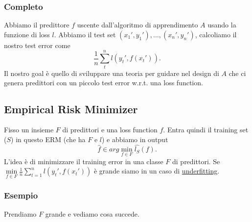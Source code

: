 \documentclass{article}
\begin{document}
\subsubsection{Completo}
Abbiamo il predittore $f$ uscente dall'algoritmo di apprendimento $A$ usando la funzione di loss $l$. Abbiamo il test set $(x_1',y_1'),\dots, (x_n',y_n')$, calcoliamo il nostro test error come
\begin{displaymath}
	\frac{1}{n} \sum\limits_t^n l(y_t', f(x_t')).
\end{displaymath}  
Il nostro goal è quello di sviluppare una teoria per guidare nel design di $A$ che ci genera predittori con un piccolo test error w.r.t. una loss function.
\subsection{Empirical Risk Minimizer}
Fisso un insieme $F$ di predittori e una loss function $f$. Entra quindi il training set ($S$) in questo ERM (che ha $F$ e $l$) e abbiamo in output
\begin{displaymath}
	\hat{f} \in arg\min\limits_{f \in F} \hat{l_S}(f).
\end{displaymath}
L'idea è di minimizzare il training error in una classe $F$ di predittori.
Se $\min\limits_{f \in F} \frac{1}{n} \sum\limits_{t=1}^{n}l(y_t', f(x_t'))$ è grande siamo in un caso di \underline{underfitting}.
\subsubsection{Esempio}
Prendiamo $F$ grande e vediamo cosa succede.
\end{document}
